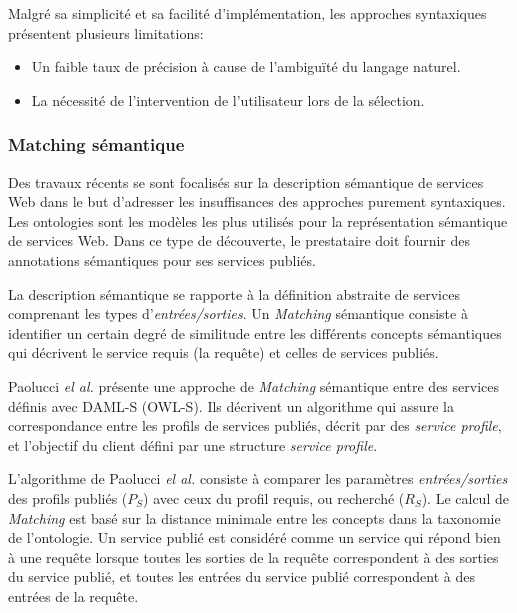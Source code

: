     Malgré sa simplicité et sa facilité d'implémentation, les
    approches syntaxiques présentent plusieurs limitations:

    \begin{itemize}\renewcommand\labelitemi{--}
    \item Un faible taux de précision à cause de l'ambiguïté du
      langage naturel.
    \item La nécessité de l'intervention de l'utilisateur lors de la
      sélection.
    \end{itemize}

    \subsubsection{Matching sémantique}
    \label{sec:matching-semanique}
    Des travaux récents \cite{paolucci2002semantic,
      benatallah2005automating, keller2004wsmo, benatallah2003request,
      jaeger2005ranked} se sont focalisés sur la description
    sémantique de services Web dans le but d'adresser les
    insuffisances des approches purement syntaxiques. Les ontologies
    sont les modèles les plus utilisés pour la représentation
    sémantique de services Web. Dans ce type de découverte, le
    prestataire doit fournir des annotations sémantiques pour ses
    services publiés.\medskip

    La description sémantique se rapporte à la définition abstraite de
    services comprenant les types d'\textit{entrées/sorties}. Un
    \textit{Matching} sémantique consiste à identifier un certain
    degré de similitude entre les différents concepts sémantiques qui
    décrivent le service requis (la requête) et celles de services
    publiés.\bigskip

    Paolucci \emph{el al.} \cite{paolucci2002semantic} présente une
    approche de \textit{Matching} sémantique entre des services
    définis avec \textsc{DAML-S} (\textsc{OWL-S}). Ils décrivent un
    algorithme qui assure la correspondance entre les profils de
    services publiés, décrit par des \textit{service profile}, et
    l'objectif du client défini par une structure \textit{service
      profile}.\medskip

    L'algorithme de Paolucci \emph{el al.} consiste à comparer les
    paramètres \textit{entrées/sorties} des profils publiés ($P_S$)
    avec ceux du profil requis, ou recherché ($R_S$). Le calcul de
    \textit{Matching} est basé sur la distance minimale entre les
    concepts dans la taxonomie de l'ontologie. Un service publié est
    considéré comme un service qui répond bien à une requête lorsque
    toutes les sorties de la requête correspondent à des sorties du
    service publié, et toutes les entrées du service publié
    correspondent à des entrées de la requête.

